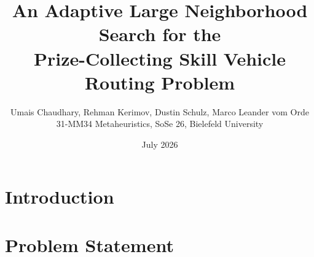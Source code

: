 \documentclass[10pt, a4paper]{article}
\title{An Adaptive Large Neighborhood Search for the\\
       Prize-Collecting Skill Vehicle Routing Problem}
\author{Umais Chaudhary, Rehman Kerimov, Dustin Schulz, Marco Leander vom Orde \\
        \small 31-MM34 Metaheuristics, SoSe 26, Bielefeld University}
\date{July 2026}
\begin{document}
\maketitle

\begin{abstract}
\end{abstract}


\section{Introduction}

\section{Problem Statement}
\end{document}
